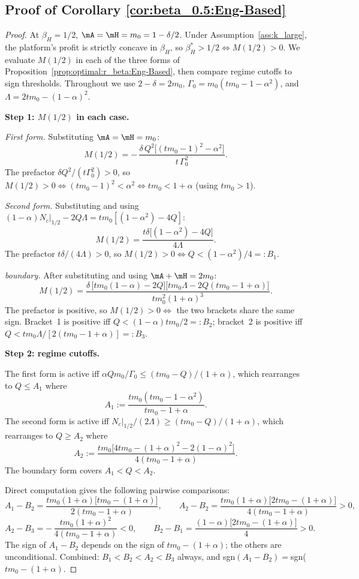 \subsection*{Proof of Corollary \ref{cor:beta_0.5:Eng-Based}}
\begin{proof}
At $\beta_H = 1/2$, $\mA = \mH = m_0 = 1 - \delta/2$. Under Assumption~\ref{ass:k_large}, the platform's profit is strictly concave in $\beta_H$, so $\beta_H^* > 1/2 \iff M(1/2) > 0$. We evaluate $M(1/2)$ in each of the three forms of Proposition~\ref{prop:optimal:r_beta:Eng-Based}, then compare regime cutoffs to sign thresholds. Throughout we use $2-\delta = 2m_0$, $\Gamma_0 = m_0(tm_0 - 1 - \alpha^2)$, and $\Lambda = 2tm_0 - (1-\alpha)^2$.
 
\medskip
\textbf{Step 1: $M(1/2)$ in each case.}
 
\emph{First form.} Substituting $\mA = \mH = m_0$:
\[
    M(1/2) = -\,\frac{\delta\,Q^2 \bigl[(tm_0-1)^2 - \alpha^2\bigr]}{t\,\Gamma_0^2}.
\]
The prefactor $\delta Q^2/(t\Gamma_0^2) > 0$, so $M(1/2) > 0 \iff (tm_0-1)^2 < \alpha^2 \iff tm_0 < 1+\alpha$ (using $tm_0 > 1$).
 
\emph{Second form.} Substituting and using $(1-\alpha) N_c|_{1/2} - 2Q\Lambda = tm_0[(1-\alpha^2) - 4Q]$:
\[
    M(1/2) = \frac{t\delta\bigl[(1-\alpha^2) - 4Q\bigr]}{4\Lambda}.
\]
The prefactor $t\delta/(4\Lambda) > 0$, so $M(1/2) > 0 \iff Q < (1-\alpha^2)/4 =: B_1$.
 
\emph{boundary.} After substituting and using $\mA + \mH = 2m_0$:
\[
    M(1/2) = \frac{\delta\,\bigl[tm_0(1-\alpha) - 2Q\bigr]\bigl[tm_0\Lambda - 2Q(tm_0 - 1 + \alpha)\bigr]}{tm_0^2 (1+\alpha)^3}.
\]
The prefactor is positive, so $M(1/2) > 0 \iff$ the two brackets share the same sign. Bracket~1 is positive iff $Q < (1-\alpha)tm_0/2 =: B_2$; bracket~2 is positive iff $Q < tm_0\Lambda/[2(tm_0-1+\alpha)] =: B_3$.
 
\medskip
\textbf{Step 2: regime cutoffs.}
 
The first form is active iff $\alpha Q m_0/\Gamma_0 \le (tm_0-Q)/(1+\alpha)$, which rearranges to $Q \le A_1$ where
\[
    A_1 := \frac{tm_0(tm_0-1-\alpha^2)}{tm_0-1+\alpha}.
\]
The second form is active iff $N_c|_{1/2}/(2\Lambda) \ge (tm_0-Q)/(1+\alpha)$, which rearranges to $Q \ge A_2$ where
\[
    A_2 := \frac{tm_0\bigl[4tm_0 - (1+\alpha)^2 - 2(1-\alpha)^2\bigr]}{4(tm_0-1+\alpha)}.
\]
The boundary form covers $A_1 < Q < A_2$.
 
Direct computation gives the following pairwise comparisons:
\[
    A_1 - B_2 = \frac{tm_0(1+\alpha)\bigl[tm_0 - (1+\alpha)\bigr]}{2(tm_0-1+\alpha)},
    \qquad
    A_2 - B_2 = \frac{tm_0(1+\alpha)\bigl[2tm_0 - (1+\alpha)\bigr]}{4(tm_0-1+\alpha)} > 0,
\]
\[
    A_2 - B_3 = -\,\frac{tm_0(1+\alpha)^2}{4(tm_0-1+\alpha)} < 0,
    \qquad
    B_2 - B_1 = \frac{(1-\alpha)\bigl[2tm_0 - (1+\alpha)\bigr]}{4} > 0.
\]
The sign of $A_1 - B_2$ depends on the sign of $tm_0 - (1+\alpha)$; the others are unconditional. Combined: $B_1 < B_2 < A_2 < B_3$ always, and sgn$(A_1 - B_2)=$sgn($tm_0 - (1+\alpha)$.
 

\end{proof}
